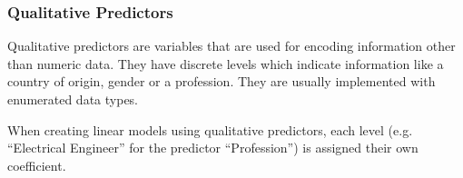 \subsubsection{Qualitative Predictors}
	Qualitative predictors are variables that are used for encoding information other than numeric data. They have discrete levels which indicate information like a country of origin, gender or a profession. They are usually implemented with enumerated data types.
	
	When creating linear models using qualitative predictors, each level (e.g. ``Electrical Engineer'' for the predictor ``Profession'') is assigned their own coefficient.